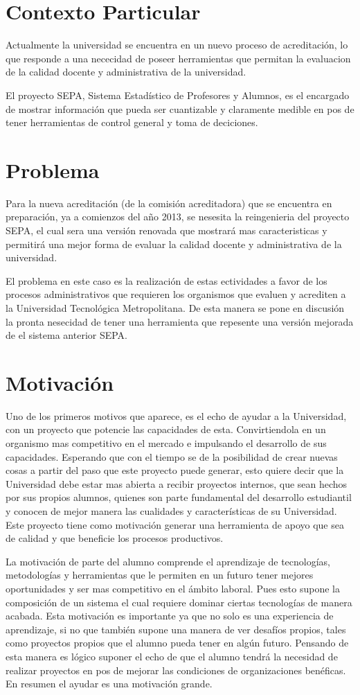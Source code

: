 \documentclass[a4paper,12pt,openany,oneside]{book}
\begin{document}
\section{Contexto Particular}
Actualmente la universidad se encuentra en un nuevo proceso de acreditación, lo que responde a una nececidad de poseer herramientas que permitan la evaluacion de la calidad docente y administrativa de la universidad.

El proyecto SEPA, Sistema Estadístico de Profesores y Alumnos, es el encargado de mostrar información que pueda ser cuantizable y claramente medible en pos de tener herramientas de control general y toma de deciciones.
\section{Problema}
Para la nueva acreditación (de la comisión acreditadora) que se encuentra en preparación, ya a comienzos del año 2013, se nesesita la reingenieria del proyecto SEPA, el cual sera una versión renovada que mostrará mas caracteristicas y permitirá una mejor forma de evaluar la calidad docente y administrativa de la universidad.

El problema en este caso es la realización de estas ectividades a favor de los procesos administrativos que requieren los organismos que evaluen y acrediten a la Universidad Tecnológica Metropolitana. De esta manera se pone en discusión la pronta nesecidad de tener una herramienta que repesente una versión mejorada de el sistema anterior SEPA.
\section{Motivación}
Uno de los primeros motivos que aparece, es el echo de ayudar a la Universidad, con un proyecto que potencie las capacidades de esta. Convirtiendola en un organismo mas competitivo en el mercado e impulsando el desarrollo de sus capacidades. Esperando que con el tiempo se de la posibilidad de crear nuevas cosas a partir del paso que este proyecto puede generar, esto quiere decir que la Universidad debe estar mas abierta a recibir proyectos internos, que sean hechos por sus propios alumnos, quienes son parte fundamental del desarrollo estudiantil y conocen de mejor manera las cualidades y características de su Universidad. Este proyecto tiene como motivación generar una herramienta de apoyo que sea de calidad y que beneficie los procesos productivos.

La motivación de parte del alumno comprende el aprendizaje de tecnologías, metodologías y herramientas que le permiten en un futuro tener mejores oportunidades y ser mas competitivo en el ámbito laboral. Pues esto supone la composición de un sistema el cual requiere dominar ciertas tecnologías de manera acabada. Esta motivación es importante ya que no solo es una experiencia de aprendizaje, si no que también supone una manera de ver desafíos propios, tales como proyectos propios que el alumno pueda tener en algún futuro. Pensando de esta manera es lógico suponer el echo de que el alumno tendrá la necesidad de realizar proyectos en pos de mejorar las condiciones de organizaciones benéficas. En resumen el ayudar es una motivación grande.
\end{document}
